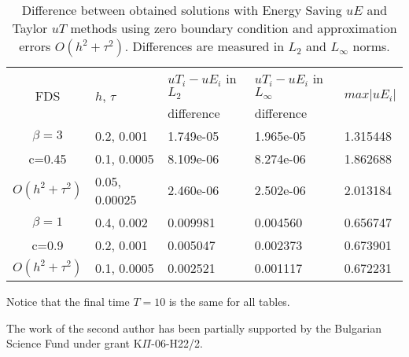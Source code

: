 \documentclass[%
 aip,
cp,  %
 amsmath,amssymb,%
 reprint,%
]{revtex4-2}
\begin{document}
\begin{table}[ht]
\centering
\small
		\begin{tabular}{||c|l|l|l|l||}
			\hline
			\hline
      \multirow{2  }{*}{FDS}        & \multirow{2  }{*}{$h$, $\tau$}  &   $uT_i - uE_i$  in $L_2$     &  $uT_i - uE_i$ in $L_\infty$ & \multirow{2  }{*}{$max|uE_i|$} \\
	                                        &                                                     &      difference                     &           difference                  &                                                       \\
   			\hline 
					\hline 
  $\beta=3$                   &0.2, 0.001         &  1.749e-05      &  1.965e-05  & 1.315448     \\
   c=0.45                        &0.1, 0.0005        &  8.109e-06       & 8.274e-06 &  1.862688     \\
     $O(h^2 + \tau^ 2)$ &0.05, 0.00025     & 2.460e-06         &2.502e-06  &   2.013184   \\
			\hline 
			\hline 
       $\beta=1$          &0.4, 0.002        & 0.009981     & 0.004560 & 0.656747   \\
                  c=0.9      &0.2, 0.001        & 0.005047      & 0.002373  & 0.673901   \\
  $O(h^2+ \tau^2)$ &0.1, 0.0005         & 0.002521      &0.001117 & 0.672231   \\
			\hline
	   \hline
			\hline 
		\end{tabular}
		\caption{Difference between obtained solutions with Energy Saving $uE$ and Taylor $uT$ methods using zero boundary condition and approximation errors $O(h^{2} + \tau^2 )$. Differences are measured in $L_2$ and $L_\infty$ norms.}
\label{tableF}
\end{table}

Notice that the final time $T=10$  is the same for all tables.

\begin{acknowledgments}
The work of the second author has been partially supported by
the Bulgarian Science Fund under grant K$\Pi$-06-H22/2.
\end{acknowledgments}

\nocite{*}
\end{document}
